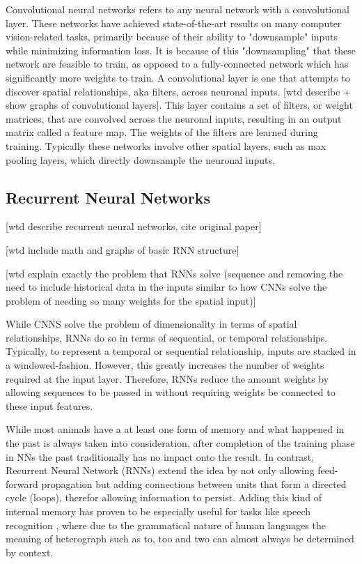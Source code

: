 Convolutional neural networks refers to any neural network with a convolutional layer.  These networks have achieved state-of-the-art results on many computer vision-related tasks, primarily because of their ability to "downsample" inputs while minimizing information loss.  It is because of this "downsampling" that these network are feasible to train, as opposed to a fully-connected network which has significantly more weights to train.  A convolutional layer is one that attempts to discover spatial relationships, aka filters, across neuronal inputs. [wtd describe + show graphs of convolutional layers].  This layer contains a set of filters, or weight matrices, that are convolved across the neuronal inputs, resulting in an output matrix called a feature map.  The weights of the filters are learned during training.  Typically these networks involve other spatial layers, such as max pooling layers, which directly downsample the neuronal inputs.

\subsection{Recurrent Neural Networks}

[wtd describe recurrent neural networks, cite original paper]

[wtd include math and graphs of basic RNN structure]

[wtd explain exactly the problem that RNNs solve (sequence and removing the need to include historical data in the inputs similar to how CNNs solve the problem of needing so many weights for the spatial input)]

While CNNS solve the problem of dimensionality in terms of spatial relationships, RNNs do so in terms of sequential, or temporal relationships.  Typically, to represent a temporal or sequential relationship, inputs are stacked in a windowed-fashion.  However, this greatly increases the number of weights required at the input layer.  Therefore, RNNs reduce the amount weights by allowing sequences to be passed in without requiring weights be connected to these input features.



While most animals have a at least one form of memory and what happened in the past is always taken into consideration, after completion of the training phase in NNs the past traditionally has no impact onto the result. 
In contrast, Recurrent Neural Network (RNNs) extend the idea by not only allowing feed-forward propagation but adding connections between units that form a directed cycle (loops), therefor allowing information to persist. 
Adding this kind of internal memory has proven to be especially useful for tasks like speech recognition \cite{sak2014long}, where due to the grammatical nature of human languages the meaning of heterograph such as to, too and two can almost always be determined by context.

